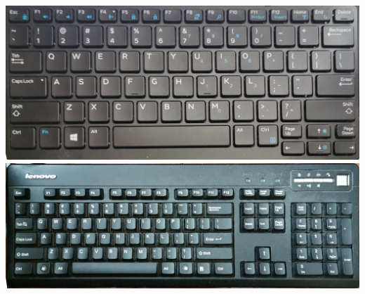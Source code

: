 \begin{center}
	\includegraphics[scale=0.12]{pic/KB1}\\\includegraphics[scale=0.12]{pic/KB2}
\end{center}\par
